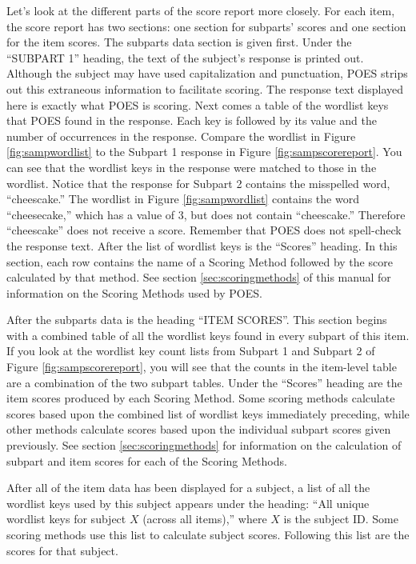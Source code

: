 \documentclass[11pt]{article}
\numberwithin{figure}{section}
\numberwithin{table}{section}
\begin{document}
Let's look at the different parts of the score report more closely.  For each item, the score report has two sections: one section for subparts' scores and one section for the item scores.  The subparts data section is given first.  Under the ``SUBPART 1'' heading, the text of the subject's response is printed out.  Although the subject may have used capitalization and punctuation, POES strips out this extraneous information to facilitate scoring.  The response text displayed here is exactly what POES is scoring.  Next comes a table of the wordlist keys that POES found in the response.  Each key is followed by its value and the number of occurrences in the response.  Compare the wordlist in Figure \ref{fig:sampwordlist} to the Subpart 1 response in Figure \ref{fig:sampscorereport}.  You can see that the wordlist keys in the response were matched to those in the wordlist.  Notice that the response for Subpart 2 contains the misspelled word, ``cheescake.''  The wordlist in Figure \ref{fig:sampwordlist} contains the word ``cheesecake,'' which has a value of 3, but does not contain ``cheescake.''  Therefore ``cheescake'' does not receive a score.  Remember that POES does not spell-check the response text.  After the list of wordlist keys is the ``Scores'' heading.  In this section, each row contains the name of a Scoring Method followed by the score calculated by that method.  See section \ref{sec:scoringmethods} of this manual for information on the Scoring Methods used by POES.

After the subparts data is the heading ``ITEM SCORES''.  This section begins with a combined table of all the wordlist keys found in every subpart of this item.  If you look at the wordlist key count lists from Subpart 1 and Subpart 2 of Figure \ref{fig:sampscorereport}, you will see that the counts in the item-level table are a combination of the two subpart tables.  Under the ``Scores'' heading are the item scores produced by each Scoring Method.  Some scoring methods calculate scores based upon the combined list of wordlist keys immediately preceding, while other methods calculate scores based upon the individual subpart scores given previously.  See section \ref{sec:scoringmethods} for information on the calculation of subpart and item scores for each of the Scoring Methods.

After all of the item data has been displayed for a subject, a list of all the wordlist keys used by this subject appears under the heading: ``All unique wordlist keys for subject $X$ (across all items),'' where $X$ is the subject ID.  Some scoring methods use this list to calculate subject scores.  Following this list are the scores for that subject.  
\end{document}
